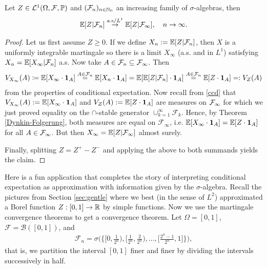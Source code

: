 \begin{llemma}
\begin{prop}\label{lemma361}
	Let $Z\in\mathcal{L}^1(\Omega,\mathcal{F},\mathbb{P})$ and $(\mathcal{F}_n)_{n\in\mathbb{N}_0}$ an increasing family of $\sigma$-algebras, then
	\begin{align*}
		\mathbb{E}[Z|\mathcal{F}_n] \overset{\text{a.s}/L^1}{\to} \mathbb{E}[Z|\mathcal{F}_{\infty}], \quad n\to\infty.
	\end{align*}
\end{prop}
\end{llemma}
\begin{proof}
	Let us first assume $Z\geq 0$. If we define $X_n := \mathbb{E}[Z|\mathcal{F}_n]$, then $X$ is a uniformly integrable martingale so there is a limit $X_{\infty}$ (a.s. and in $L^1$) satisfying $X_n = \mathbb{E}[X_{\infty}|\mathcal{F}_n]$ a.s. Now take $A\in\mathcal{F}_n \subseteq \mathcal{F}_{\infty}$. Then
	\begin{align*}
		V_{X_{\infty}}(A)\coloneqq \mathbb{E}[X_{\infty}\cdot \mathbf 1_A] \overset{A\in\mathcal{F}_n}{=} \mathbb{E}[X_n\cdot \mathbf 1_A] = \mathbb{E}[\mathbb{E}[Z|\mathcal F_n] \cdot \mathbf  1_A]\overset{A\in \mathcal F_n}=\mathbb{E}[Z\cdot \mathbf  1_A] =: V_Z(A)
	\end{align*}
	from the properties of conditional expectation. Now recall from \ref{ccd} that $V_{X_{\infty}}(A):=\mathbb{E}[X_\infty\cdot \mathbf 1_A]$ and $V_Z(A):=\mathbb{E}[Z\cdot \mathbf 1_A]$ are measures on $\mathcal{F}_\infty$ for which we just proved equality on the $\cap$-stable generator $\cup_{k=1}^\infty \mathcal F_k$. Hence, by Theorem \ref{Dynkin-Folgerung}, both measures are equal on $\mathcal F_\infty$, i.e. $\mathbb{E}[X_{\infty}\cdot \mathbf 1_A] = \mathbb{E}[Z\cdot \mathbf 1_A]$ for all $A\in \mathcal{F}_{\infty}$. But then $X_{\infty} = \mathbb{E}[Z|\mathcal{F}_{\infty}]$ almost surely.\smallskip
	
	Finally, splitting $Z=Z^+-Z^-$ and applying the above to both summands yields the claim. 
\end{proof}
Here is a fun application that completes the story of interpreting conditional expectation as approximation with information given by the $\sigma$-algebra. Recall the pictures from Section \ref{sec:gentle} where we best (in the sense of $L^2$) approximated a Borel function $Z:[0,1]\to\mathbb{R}$ by simple functions. Now we use the martingale convergence theorems to get a convergence theorem. Let $\Omega=[0,1]$, $\mathcal F=\mathcal B([0,1])$, and
\begin{align*}
	\mathcal F_n=\sigma\Big(\Big\{\Big[0,\frac{1}{2^n}\Big),\Big[\frac{1}{2^n},\frac{2}{2^n}\Big),...,\Big[\frac{2^n-1}{2^n},1\Big]\Big\}\Big),
\end{align*}
that is, we partition the interval $[0,1]$ finer and finer by dividing the intervals successively in half.


